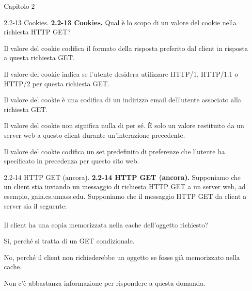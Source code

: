 \documentclass[11pt]{article}
\begin{document}
\begin{quiz}{Capitolo 2}
\begin{multi}[points=1,shuffle]{2.2-13 Cookies.}
\textbf{2.2-13 Cookies.} Qual è lo scopo di un valore del cookie nella richiesta HTTP GET?
\item Il valore del cookie codifica il formato della risposta preferito dal client in risposta a questa richiesta GET.
\item Il valore del cookie indica se l'utente desidera utilizzare HTTP/1, HTTP/1.1 o HTTP/2 per questa richiesta GET.
\item Il valore del cookie è una codifica di un indirizzo email dell'utente associato alla richiesta GET.
\item* Il valore del cookie non significa nulla di per sé. È solo un valore restituito da un server web a questo client durante un'interazione precedente.
\item Il valore del cookie codifica un set predefinito di preferenze che l'utente ha specificato in precedenza per questo sito web.
\end{multi}
    

\begin{multi}[points=1,shuffle]{2.2-14 HTTP GET (ancora).}
\textbf{2.2-14 HTTP GET (ancora).} 
Supponiamo che un client stia inviando un messaggio di richiesta HTTP GET a un server web, ad esempio, gaia.cs.umass.edu. 
Supponiamo che il messaggio HTTP GET da client a server sia il seguente: \\

\\

Il client ha una copia memorizzata nella cache dell'oggetto richiesto?
\item* Sì, perché si tratta di un GET condizionale.
\item No, perché il client non richiederebbe un oggetto se fosse già memorizzato nella cache.
\item Non c'è abbastanza informazione per rispondere a questa domanda.
\end{multi}
    


\end{quiz}
\end{document}
